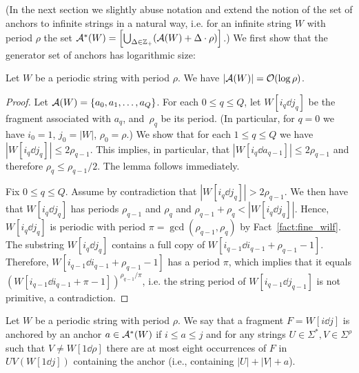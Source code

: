 (In the next section we slightly abuse notation and extend the notion of the set of anchors to infinite strings in a natural way, i.e. for an infinite string $W$ with period $\rho$ the set $\mathcal{A}^\ast(W) = \left[\bigcup_{\Delta \in \mathbb{Z}_+} (\mathcal{A}(W) + \Delta \cdot \rho)\right]$.) 
We first show that the generator set of anchors has logarithmic size:

\begin{lemma}\label{lm:anchors}
Let $W$ be a periodic string with period $\rho$. We have $|\mathcal{A}(W)| = \mathcal{O}(\log \rho)$. 
\end{lemma}
\begin{proof}
Let $\mathcal{A}(W) = \{a_0, a_1, \ldots, a_Q\}$. For each $0 \le q \le Q$, let $W[i_q \dd j_q]$ be the fragment associated with $a_q$, and~$\rho_q$ be its period. (In particular, for $q = 0$ we have $i_0 = 1$, $j_0 = |W|$, $\rho_0 = \rho$.) We show that for each $1 \le q \le Q$ we have $|W[i_q \dd j_q]| \le 2 \rho_{q-1}$. This implies, in particular, that $|W[i_q\dd a_{q-1}]| \le  2 \rho_{q-1}$ and therefore $\rho_q \leq \rho_{q-1} / 2$. The lemma follows immediately. 

Fix $0 \le q \le Q$. Assume by contradiction that $|W[i_q \dd j_q]| > 2 \rho_{q-1}$. We then have that $W[i_q \dd j_q]$ has periods $\rho_{q-1}$ and $\rho_q$ and $\rho_{q-1}+\rho_q < |W[i_q \dd j_q]|$. Hence, $W[i_q \dd j_q]$ is periodic with period $\pi = \gcd(\rho_{q-1},\rho_q)$ by Fact~\ref{fact:fine_wilf}. The substring $W[i_q \dd j_q]$ contains a full copy of $W[i_{q-1} \dd i_{q-1}+\rho_{q-1}-1]$. Therefore, $W[i_{q-1} \dd i_{q-1}+\rho_{q-1}-1]$ has a period $\pi$, which implies that it equals $(W[i_{q-1} \dd i_{q-1}+\pi-1])^{\rho_{q-1}/\pi}$, i.e. the string period of $W[i_{q-1} \dd j_{q-1}]$ is not primitive, a contradiction. 
\end{proof}


\begin{definition}
Let $W$ be a periodic string with period $\rho$. We say that a fragment $F = W[i \dd j]$ is anchored by an anchor $a \in \mathcal{A}^\ast(W)$ if $i \leq a \leq j$ and for any strings $U \in \Sigma^\ast, V \in \Sigma^\rho$ such that $V \neq W[1 \dd \rho]$ there are at most eight occurrences of $F$ in $UV(W[1\dd j])$ containing the anchor (i.e., containing $|U|+|V|+a$). 
\end{definition}

